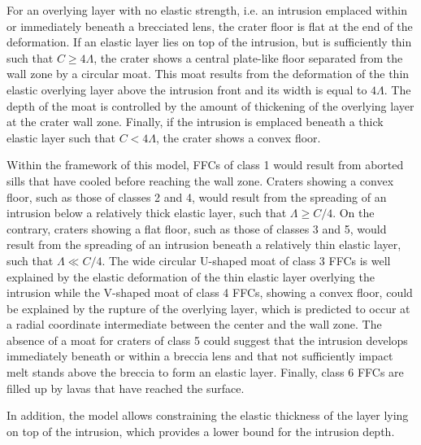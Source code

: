 For an  overlying layer with  no elastic strength, i.e.   an intrusion
emplaced within or  immediately beneath a brecciated  lens, the crater
floor is flat at the end of  the deformation. If an elastic layer lies
on  top  of  the  intrusion,   but  is  sufficiently  thin  such  that
$C\ge 4\Lambda$, the crater shows a central plate-like floor separated
from the  wall zone by  a circular moat.   This moat results  from the
deformation of  the thin elastic  overlying layer above  the intrusion
front and its width  is equal to $4\Lambda$. The depth  of the moat is
controlled by the  amount of thickening of the overlying  layer at the
crater wall  zone.  Finally,  if the intrusion  is emplaced  beneath a
thick elastic layer such that $C< 4\Lambda$, the crater shows a convex
floor.

Within the framework of this model,  FFCs of class 1 would result from
aborted sills that have cooled  before reaching the wall zone. Craters
showing a convex floor, such as those of classes 2 and 4, would result
from the  spreading of an  intrusion below a relatively  thick elastic
layer, such that $\Lambda \ge C/4$. On the contrary, craters showing a
flat floor, such  as those of classes  3 and 5, would  result from the
spreading of  an intrusion  beneath a  relatively thin  elastic layer,
such that $\Lambda \ll C/4$. The  wide circular U-shaped moat of class
3  FFCs is  well  explained by  the elastic  deformation  of the  thin
elastic layer overlying the intrusion while the V-shaped moat of class
4 FFCs, showing  a convex floor, could be explained  by the rupture of
the  overlying  layer,  which  is  predicted  to  occur  at  a  radial
coordinate  intermediate between  the center  and the  wall zone.  The
absence  of a  moat for  craters  of class  5 could  suggest that  the
intrusion develops  immediately beneath or  within a breccia  lens and
that not sufficiently impact melt stands  above the breccia to form an
elastic layer. Finally, class 6 FFCs  are filled up by lavas that have
reached the surface.
	
In addition,  the model allows  constraining the elastic  thickness of
the layer lying on top of  the intrusion, which provides a lower bound
for the intrusion depth.

